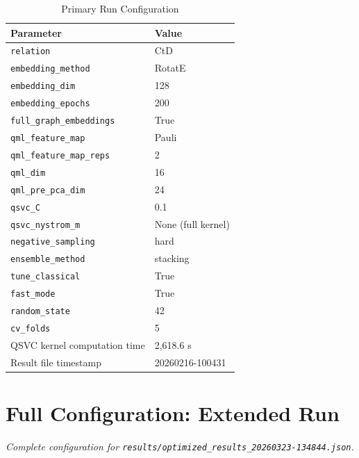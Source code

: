 \documentclass[twocolumn,10pt]{article}
\begin{document}
\begin{table}[t]
\centering
\caption{Primary Run Configuration}
\label{tab:config_primary}
\begin{tabular}{@{}ll@{}}
\toprule
\textbf{Parameter} & \textbf{Value} \\
\midrule
\texttt{relation} & CtD \\
\texttt{embedding\_method} & RotatE \\
\texttt{embedding\_dim} & 128 \\
\texttt{embedding\_epochs} & 200 \\
\texttt{full\_graph\_embeddings} & True \\
\texttt{qml\_feature\_map} & Pauli \\
\texttt{qml\_feature\_map\_reps} & 2 \\
\texttt{qml\_dim} & 16 \\
\texttt{qml\_pre\_pca\_dim} & 24 \\
\texttt{qsvc\_C} & 0.1 \\
\texttt{qsvc\_nystrom\_m} & None (full kernel) \\
\texttt{negative\_sampling} & hard \\
\texttt{ensemble\_method} & stacking \\
\texttt{tune\_classical} & True \\
\texttt{fast\_mode} & True \\
\texttt{random\_state} & 42 \\
\texttt{cv\_folds} & 5 \\
QSVC kernel computation time & 2,618.6 s \\
Result file timestamp & 20260216-100431 \\
\bottomrule
\end{tabular}
\end{table}

\section{Full Configuration: Extended Run}
\label{app:extended_config}

\textit{Complete configuration for \texttt{results/optimized\_results\_20260323-134844.json}.}
\end{document}
